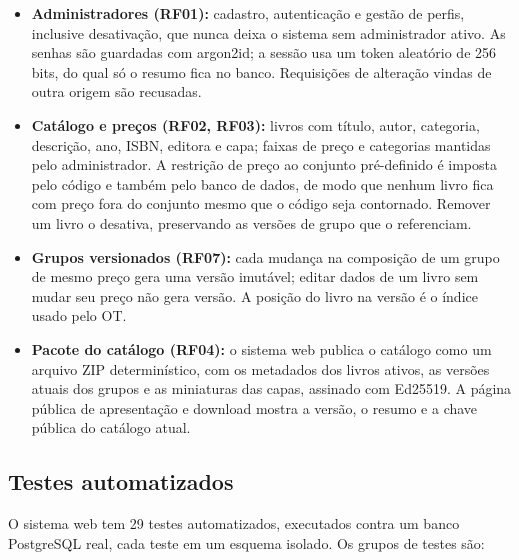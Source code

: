 \documentclass[12pt, oneside, a4paper, english, brazil]{abntex2}
\begin{document}
\begin{itemize}
\item \textbf{Administradores (RF01):} cadastro, autenticação e gestão de
perfis, inclusive desativação, que nunca deixa o sistema sem administrador
ativo. As senhas são guardadas com argon2id; a sessão usa um token aleatório
de 256 bits, do qual só o resumo fica no banco. Requisições de alteração
vindas de outra origem são recusadas.

\item \textbf{Catálogo e preços (RF02, RF03):} livros com título, autor,
categoria, descrição, ano, ISBN, editora e capa; faixas de preço e categorias
mantidas pelo administrador. A restrição de preço ao conjunto pré-definido é
imposta pelo código e também pelo banco de dados, de modo que nenhum livro
fica com preço fora do conjunto mesmo que o código seja contornado. Remover
um livro o desativa, preservando as versões de grupo que o referenciam.

\item \textbf{Grupos versionados (RF07):} cada mudança na composição de um
grupo de mesmo preço gera uma versão imutável; editar dados de um livro sem
mudar seu preço não gera versão. A posição do livro na versão é o índice
usado pelo OT.

\item \textbf{Pacote do catálogo (RF04):} o sistema web publica o catálogo
como um arquivo ZIP determinístico, com os metadados dos livros ativos, as
versões atuais dos grupos e as miniaturas das capas, assinado com Ed25519. A
página pública de apresentação e download mostra a versão, o resumo e a chave
pública do catálogo atual.
\end{itemize}

\subsection{Testes automatizados}

O sistema web tem 29 testes automatizados, executados contra um banco
PostgreSQL real, cada teste em um esquema isolado. Os grupos de testes são:
\end{document}
